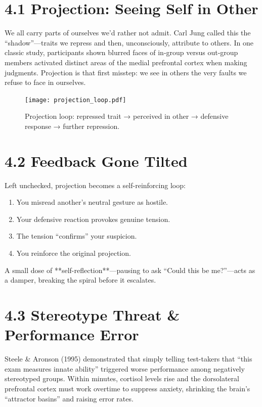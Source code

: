 \documentclass{book}       %
\begin{document}
\section*{4.1  Projection: Seeing Self in Other}

We all carry parts of ourselves we’d rather not admit.  Carl Jung called this the “shadow”—traits we repress and then, unconsciously, attribute to others.  In one classic study, participants shown blurred faces of in‐group versus out‐group members activated distinct areas of the medial prefrontal cortex when making judgments\cite{Amodio2014_SocialBrain}.  Projection is that first misstep: we see in others the very faults we refuse to face in ourselves.

\begin{figure}
  \texttt{[image: projection\_loop.pdf]}
  \caption{Projection loop: repressed trait → perceived in other → defensive response → further repression.}
\end{figure}

\section*{4.2  Feedback Gone Tilted}

Left unchecked, projection becomes a self-reinforcing loop:

\begin{enumerate}[noitemsep]
  \item You misread another’s neutral gesture as hostile.
  \item Your defensive reaction provokes genuine tension.
  \item The tension “confirms” your suspicion.
  \item You reinforce the original projection.
\end{enumerate}

A small dose of **self-reflection**—pausing to ask “Could this be me?”—acts as a damper, breaking the spiral before it escalates.

\section*{4.3  Stereotype Threat \& Performance Error}

Steele \& Aronson (1995) demonstrated that simply telling test-takers that “this exam measures innate ability” triggered worse performance among negatively stereotyped groups\cite{Steele1995_Stereotype,Spencer1999_Math}.  Within minutes, cortisol levels rise and the dorsolateral prefrontal cortex must work overtime to suppress anxiety, shrinking the brain’s “attractor basins” and raising error rates\cite{Townsend2010_Cortisol,Krendl2008_fMRIThreat}.
\end{document}
